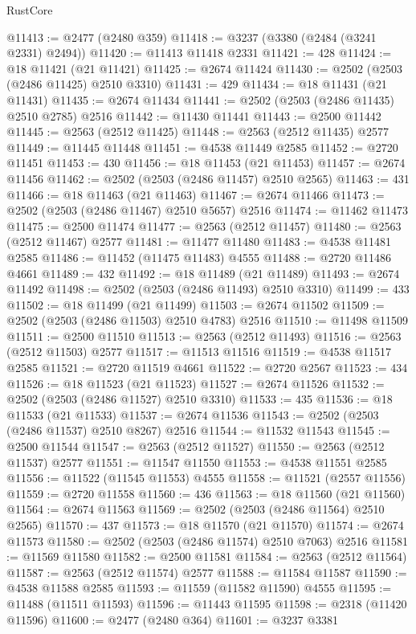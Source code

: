 \begin{lexlean}{RustCore}
\begin{coremodule}
@11413 := @2477 (@2480 @359)
@11418 := @3237 (@3380 (@2484 (@3241 @2331) @2494))
@11420 := @11413 @11418 @2331
@11421 := 428
@11424 := @18 @11421 (@21 @11421)
@11425 := @2674 @11424
@11430 := @2502 (@2503 (@2486 @11425) @2510 @3310)
@11431 := 429
@11434 := @18 @11431 (@21 @11431)
@11435 := @2674 @11434
@11441 := @2502 (@2503 (@2486 @11435) @2510 @2785) @2516
@11442 := @11430 @11441
@11443 := @2500 @11442
@11445 := @2563 (@2512 @11425)
@11448 := @2563 (@2512 @11435) @2577
@11449 := @11445 @11448
@11451 := @4538 @11449 @2585
@11452 := @2720 @11451
@11453 := 430
@11456 := @18 @11453 (@21 @11453)
@11457 := @2674 @11456
@11462 := @2502 (@2503 (@2486 @11457) @2510 @2565)
@11463 := 431
@11466 := @18 @11463 (@21 @11463)
@11467 := @2674 @11466
@11473 := @2502 (@2503 (@2486 @11467) @2510 @5657) @2516
@11474 := @11462 @11473
@11475 := @2500 @11474
@11477 := @2563 (@2512 @11457)
@11480 := @2563 (@2512 @11467) @2577
@11481 := @11477 @11480
@11483 := @4538 @11481 @2585
@11486 := @11452 (@11475 @11483) @4555
@11488 := @2720 @11486 @4661
@11489 := 432
@11492 := @18 @11489 (@21 @11489)
@11493 := @2674 @11492
@11498 := @2502 (@2503 (@2486 @11493) @2510 @3310)
@11499 := 433
@11502 := @18 @11499 (@21 @11499)
@11503 := @2674 @11502
@11509 := @2502 (@2503 (@2486 @11503) @2510 @4783) @2516
@11510 := @11498 @11509
@11511 := @2500 @11510
@11513 := @2563 (@2512 @11493)
@11516 := @2563 (@2512 @11503) @2577
@11517 := @11513 @11516
@11519 := @4538 @11517 @2585
@11521 := @2720 @11519 @4661
@11522 := @2720 @2567
@11523 := 434
@11526 := @18 @11523 (@21 @11523)
@11527 := @2674 @11526
@11532 := @2502 (@2503 (@2486 @11527) @2510 @3310)
@11533 := 435
@11536 := @18 @11533 (@21 @11533)
@11537 := @2674 @11536
@11543 := @2502 (@2503 (@2486 @11537) @2510 @8267) @2516
@11544 := @11532 @11543
@11545 := @2500 @11544
@11547 := @2563 (@2512 @11527)
@11550 := @2563 (@2512 @11537) @2577
@11551 := @11547 @11550
@11553 := @4538 @11551 @2585
@11556 := @11522 (@11545 @11553) @4555
@11558 := @11521 (@2557 @11556)
@11559 := @2720 @11558
@11560 := 436
@11563 := @18 @11560 (@21 @11560)
@11564 := @2674 @11563
@11569 := @2502 (@2503 (@2486 @11564) @2510 @2565)
@11570 := 437
@11573 := @18 @11570 (@21 @11570)
@11574 := @2674 @11573
@11580 := @2502 (@2503 (@2486 @11574) @2510 @7063) @2516
@11581 := @11569 @11580
@11582 := @2500 @11581
@11584 := @2563 (@2512 @11564)
@11587 := @2563 (@2512 @11574) @2577
@11588 := @11584 @11587
@11590 := @4538 @11588 @2585
@11593 := @11559 (@11582 @11590) @4555
@11595 := @11488 (@11511 @11593)
@11596 := @11443 @11595
@11598 := @2318 (@11420 @11596)
@11600 := @2477 (@2480 @364)
@11601 := @3237 @3381

\end{coremodule}
\end{lexlean}
